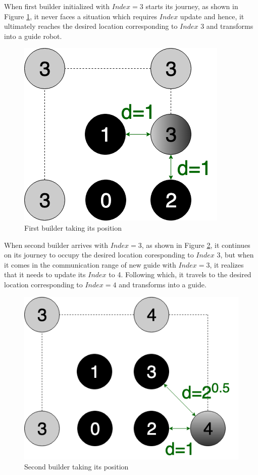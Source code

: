 \documentclass{report}[12pt]
\begin{document}
When first builder initialized with $Index=3$ starts its journey, as shown in Figure \ref{fig:shape_formation_process_1}, it never faces a situation which requires $Index$ update and hence, it ultimately reaches the desired location corresponding to $Index$ 3 and transforms into a guide robot. 
\begin{figure}[H]
	\centering
	\includegraphics[scale=0.4]{"images/shape_formation_process_1"}
	\caption{First builder taking its position}
	\label{fig:shape_formation_process_1}
\end{figure}
When second builder arrives with $Index=3$, as shown in Figure \ref{fig:shape_formation_process_2}, it continues on its journey to occupy the desired location coresponding to $Index$ 3, but when it comes in the communication range of new guide with $Index=3$, it realizes that it needs to update its $Index$ to 4. Following which, it travels to the desired location corresponding to $Index=4$ and transforms into a guide.
\begin{figure}[H]
	\centering
	\includegraphics[scale=0.4]{"images/shape_formation_process_2"}
	\caption{Second builder taking its position}
	\label{fig:shape_formation_process_2}
\end{figure}
\end{document}
